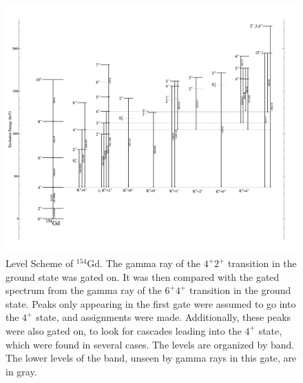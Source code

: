 \begin{figure}[!]
    \centering
    \includegraphics[scale=0.18]{154GdTablesAndFigs/154Gd_4to2.png}
    \caption{Level Scheme of $^{154}$Gd. The gamma ray of the $4^+$\rightarrow$2^+$ transition in the ground state was gated on. It was then compared with the gated spectrum from the gamma ray of the $6^+$\rightarrow$4^+$ transition in the ground state. Peaks only appearing in the first gate were assumed to go into the $4^+$ state, and assignments were made. Additionally, these peaks were also gated on, to look for cascades leading into the $4^+$ state, which were found in several cases. The levels are organized by band. The lower levels of the band, unseen by gamma rays in this gate, are in gray.}
    \label{fig:154_4to2}
\end{figure}

